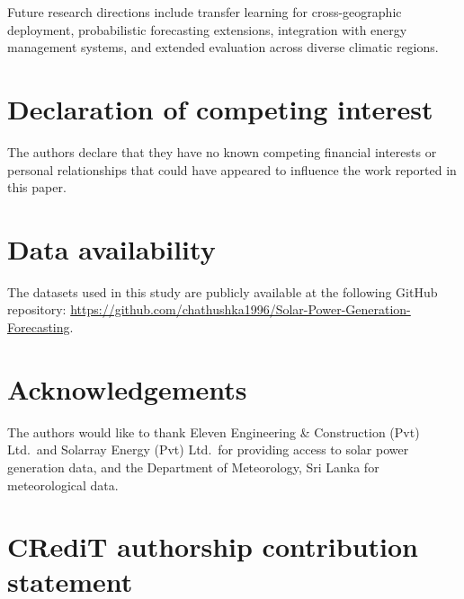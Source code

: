 \documentclass[a4paper,fleqn]{cas-dc}
\begin{document}
Future research directions include transfer learning for cross-geographic deployment, probabilistic forecasting extensions, integration with energy management systems, and extended evaluation across diverse climatic regions.

\section*{Declaration of competing interest}

The authors declare that they have no known competing financial interests or personal relationships that could have appeared to influence the work reported in this paper.

\section*{Data availability}

The datasets used in this study are publicly available at the following GitHub repository: \url{https://github.com/chathushka1996/Solar-Power-Generation-Forecasting}.

\section*{Acknowledgements}

The authors would like to thank Eleven Engineering \& Construction (Pvt) Ltd.\ and Solarray Energy (Pvt) Ltd.\ for providing access to solar power generation data, and the Department of Meteorology, Sri Lanka for meteorological data.

\section*{CRediT authorship contribution statement}

\printcredits



\end{document}
